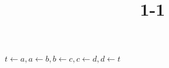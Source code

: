 \documentclass{article}
\title{1-1}
\begin{document}
\maketitle

\( t \leftarrow a, a \leftarrow b, b \leftarrow c, c \leftarrow d, d \leftarrow t \)
\end{document}
